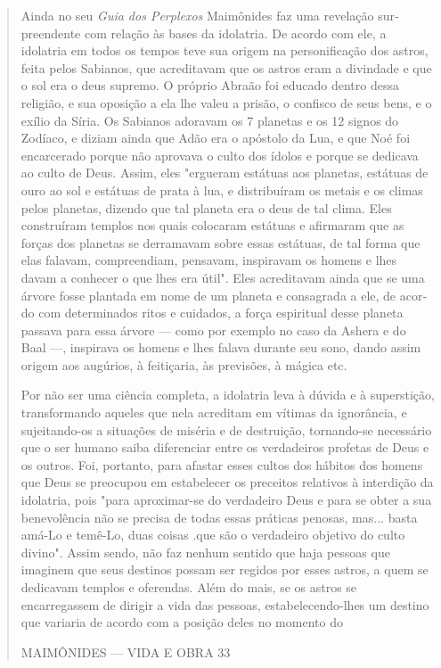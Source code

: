 \begin{quote}
Ainda no seu \emph{Guia dos Perplexos} Maimônides faz uma revelação
sur­preendente com relação às bases da idolatria. De acordo com ele, a
idolatria em todos os tempos teve sua origem na personificação dos
astros, feita pelos Sabianos, que acreditavam que os astros eram a
divindade e que o sol era o deus supremo. O próprio Abraão foi educado
dentro dessa religião, e sua opo­sição a ela lhe valeu a prisão, o
confisco de seus bens, e o exílio da Síria. Os Sabianos adoravam os 7
planetas e os 12 signos do Zodíaco, e diziam ainda que Adão era o
apóstolo da Lua, e que Noé foi encarcerado porque não aprovava o culto
dos ídolos e porque se dedicava ao culto de Deus. Assim, eles "ergue­ram
estátuas aos planetas, estátuas de ouro ao sol e estátuas de prata à
lua, e distribuíram os metais e os climas pelos planetas, dizendo que
tal planeta era o deus de tal clima. Eles construíram templos nos quais
colocaram estátuas e afirmaram que as forças dos planetas se derramavam
sobre essas estátuas, de tal forma que elas falavam, compreendiam,
pensavam, inspiravam os homens e lhes davam a conhecer o que lhes era
útil". Eles acreditavam ainda que se uma árvore fosse plantada em nome
de um planeta e consagrada a ele, de acor­do com determinados ritos e
cuidados, a força espiritual desse planeta passava para essa árvore ---
como por exemplo no caso da Ashera e do Baal ---, inspira­va os homens e
lhes falava durante seu sono, dando assim origem aos augúrios, à
feitiçaria, às previsões, à mágica etc.

Por não ser uma ciência completa, a idolatria leva à dúvida e à
su­perstição, transformando aqueles que nela acreditam em vítimas da
ignorância, e sujeitando-os a situações de miséria e de destruição,
tornando-se necessário que o ser humano saiba diferenciar entre os
verdadeiros profetas de Deus e os outros. Foi, portanto, para afastar
esses cultos dos hábitos dos homens que Deus se preocupou em estabelecer
os preceitos relativos à interdição da idolatria, pois "para
aproximar-se do verdadeiro Deus e para se obter a sua benevolência não
se precisa de todas essas práticas penosas, mas... basta amá-Lo e
temê-Lo, duas coisas .que são o verdadeiro objetivo do culto divino".
Assim sendo, não faz nenhum sentido que haja pessoas que imaginem que
seus destinos possam ser regidos por esses astros, a quem se dedicavam
templos e oferendas. Além do mais, se os astros se encarregassem de
dirigir a vida das pessoas, estabelecendo-lhes um destino que variaria
de acordo com a posição deles no momento do

MAIMÔNIDES --- VIDA E OBRA 33


\end{quote}

